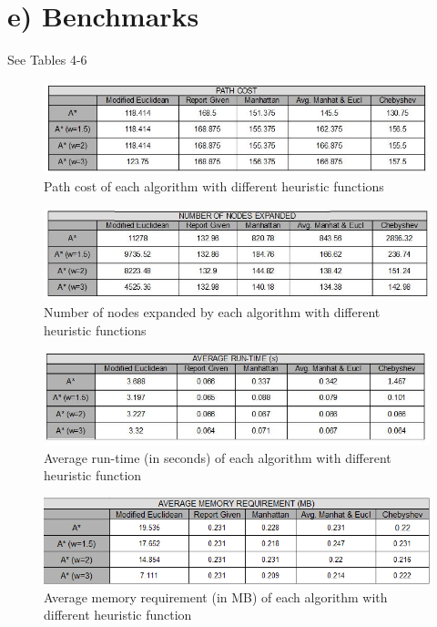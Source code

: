 \documentclass[a4paper]{article}
\begin{document}
\section*{e) Benchmarks}

	See Tables 4-6
    
  \begin{figure}[!h]
  \centering
  \includegraphics[width=150mm]{pathcost.JPG}
  \caption{\label{fig:Table1}Path cost of each algorithm with different heuristic functions}
  \end{figure}
  
  \begin{figure}[!ht]
  \centering
  \includegraphics[width=150mm]{nodesexpanded.JPG}
  \caption{\label{fig:Table2}Number of nodes expanded by each algorithm with different heuristic functions}
  \end{figure}
  
  \begin{figure}[!h]
  \centering
  \includegraphics[width=150mm]{avgruntime.JPG}
  \caption{\label{Table3}Average run-time (in seconds) of each algorithm with different heuristic function}
  \end{figure}
  
  \begin{figure}[!h]
  \centering
  \includegraphics[width=150mm]{memory_req.png}
  \caption{\label{Table4}Average memory requirement (in MB) of each algorithm with different heuristic function}
  \end{figure}
\end{document}
